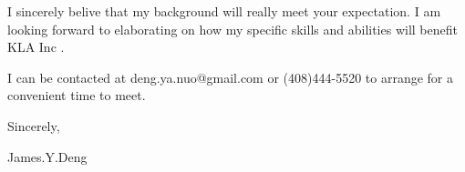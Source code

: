 { \bigbreak } 
I sincerely belive that my background will really meet your expectation.
I am looking forward to elaborating on how my specific skills and abilities will benefit KLA Inc .

{ \bigbreak } 
I can be contacted at deng.ya.nuo@gmail.com
or (408)444-5520 to arrange for a convenient time to meet.

{ \bigbreak } 




\vskip 60pt

{ \bigbreak } 
Sincerely,

James.Y.Deng

\bye
